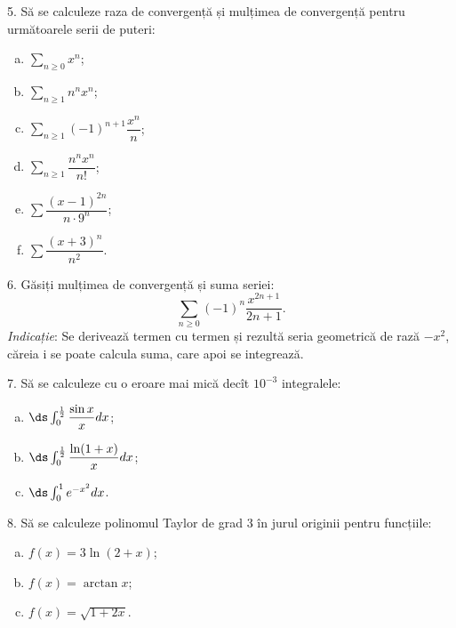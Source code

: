 
5. Să se calculeze raza de convergență și mulțimea de convergență pentru
următoarele serii de puteri:
\begin{enumerate}[(a)]
\item $ \sum_{n \geq 0} x^n $;
\item $ \sum_{n \geq 1} n^n x^n $;
\item $ \sum_{n \geq 1} (-1)^{n+1} \dfrac{x^n}{n} $;
\item $ \sum_{n \geq 1} \dfrac{n^nx^n}{n!} $;
\item $ \sum \dfrac{(x - 1)^{2n}}{n \cdot 9^n} $;
\item $ \sum \dfrac{(x + 3)^n}{n^2} $.
\end{enumerate}

\vspace{1cm}

6. Găsiți mulțimea de convergență și suma seriei:
\[
  \sum_{n \geq 0} (-1)^n \frac{x^{2n+1}}{2n + 1}.
\]
\emph{Indicație}: Se derivează termen cu termen și rezultă seria
geometrică de rază $ -x^2 $, căreia i se poate calcula suma, care apoi
se integrează.

\vspace{1cm}

7. Să se calculeze cu o eroare mai mică decît $ 10^{-3}$ integralele:
\begin{enumerate}[(a)]
\item $ \ds\int_0^{\frac{1}{2}} \dfrac{\sin x}{x} dx $;
\item $ \ds\int_0^{\frac{1}{2}} \dfrac{\ln(1 + x)}{x} dx $;
\item $ \ds\int_0^1 e^{-x^2} dx $.
\end{enumerate}


\vspace{1cm}

8. Să se calculeze polinomul Taylor de grad 3 în jurul originii
pentru funcțiile:
\begin{enumerate}[(a)]
\item $ f(x) = 3 \ln(2 + x) $;
\item $ f(x) = \arctan x $;
\item $ f(x) = \sqrt{1 + 2x} $.
\end{enumerate}







